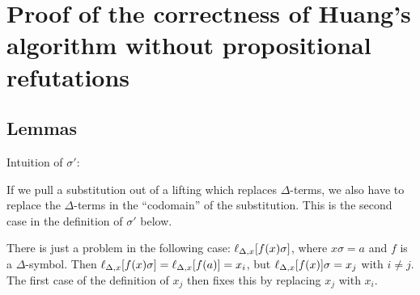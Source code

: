\documentclass[,%
	paper=a4,%
	DIV14, 
	liststotoc,
	bibtotoc,
	draft=false,%
	numbers=noendperiod
]{scrartcl}
\newcommand{\lif}[1]{\lift{\Delta}{#1}{x}}
\begin{document}
\section{Proof of the correctness of Huang's algorithm without propositional refutations}

\subsection{Lemmas}

Intuition of $\sigma'$:

If we pull a substitution out of a lifting which replaces $\Delta$-terms, we also have to replace the $\Delta$-terms 
in the ``codomain'' of the substitution. This is the second case in the definition of $\sigma'$ below.

There is just a problem in the following case: $\lif{ f(x)\sigma }$, where $x\sigma = a$ and $f$ is a $\Delta$-symbol.
Then $\lif{ f(x)\sigma } = \lif{ f(a) } = x_i$, but $\lif{f(x)}\sigma = x_j$ with $i\neq j$.
The first case of the definition of $x_j$ then fixes this by replacing $x_j$ with $x_i$. 
\end{document}
